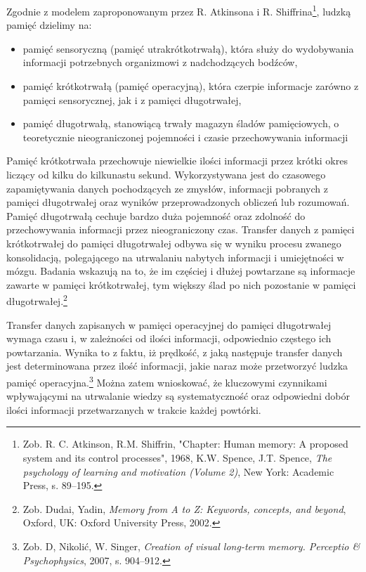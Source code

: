 \documentclass{pracamgr}
\begin{document}
Zgodnie z modelem zaproponowanym przez R. Atkinsona i R. Shiffrina\footnote{Zob. R. C. Atkinson, R.M. Shiffrin, "Chapter: Human memory: A proposed system and its control processes", 1968, K.W. Spence, J.T. Spence, \textit{The psychology of learning and motivation (Volume 2)}, New York: Academic Press, s. 89–195.}, ludzką pamięć dzielimy na:
\begin{itemize}
\item pamięć sensoryczną (pamięć utrakrótkotrwałą), która służy do wydobywania informacji potrzebnych organizmowi z nadchodzących bodźców,
\item pamięć krótkotrwałą (pamięć operacyjną), która czerpie informacje zarówno z pamięci sensorycznej, jak i z pamięci długotrwałej,
\item pamięć długotrwałą, stanowiącą trwały magazyn śladów pamięciowych, o teoretycznie nieograniczonej pojemności i czasie przechowywania informacji
\end{itemize}  
Pamięć krótkotrwała przechowuje niewielkie ilości informacji przez krótki okres liczący od kilku do kilkunastu sekund. Wykorzystywana jest do czasowego zapamiętywania danych pochodzących ze zmysłów, informacji pobranych z pamięci długotrwałej oraz wyników przeprowadzonych obliczeń lub rozumowań. Pamięć długotrwałą cechuje bardzo duża pojemność oraz zdolność do przechowywania informacji przez nieograniczony czas. Transfer danych z pamięci krótkotrwałej do pamięci długotrwałej odbywa się w wyniku procesu zwanego konsolidacją, polegającego na utrwalaniu nabytych informacji i umiejętności w mózgu. Badania wskazują na to, że im częściej i dłużej powtarzane są informacje zawarte w pamięci krótkotrwałej, tym większy ślad po nich pozostanie w pamięci długotrwałej.\footnote{Zob. Dudai, Yadin, \textit{Memory from A to Z: Keywords, concepts, and beyond}, Oxford, UK: Oxford University Press, 2002.}

Transfer danych zapisanych w pamięci operacyjnej do pamięci długotrwałej wymaga czasu i, w zależności od ilości informacji, odpowiednio częstego ich powtarzania. Wynika to z faktu, iż prędkość, z jaką następuje transfer danych jest determinowana przez ilość informacji, jakie naraz może przetworzyć ludzka pamięć operacyjna.\footnote{Zob. D, Nikolić, W. Singer, \textit{Creation of visual long-term memory. Perceptio \& Psychophysics}, 2007, s. 904–912.} Można zatem wnioskować, że kluczowymi czynnikami wpływającymi na utrwalanie wiedzy są systematyczność oraz odpowiedni dobór ilości informacji przetwarzanych w trakcie każdej powtórki. 
\end{document}
